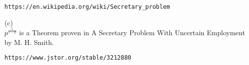 \begin{verbatim}
https://en.wikipedia.org/wiki/Secretary_problem
\end{verbatim}

(c) \\
$\boxed{p^{\frac{1}{1-p}}}$ is a Theorem proven in A Secretary Problem With Uncertain Employment by M. H. Smith.

\begin{verbatim}
https://www.jstor.org/stable/3212880
\end{verbatim}





